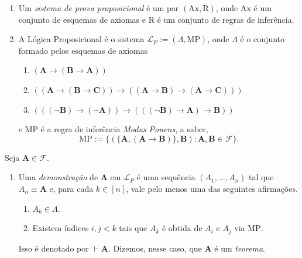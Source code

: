 \begin{definition}
    \leavevmode
        \begin{enumerate}[leftmargin=*, align=left, label=\textbf{(\alph*)}]
            \item Um \emph{sistema de prova proposicional} é um par $(\mathrm{Ax}, \mathrm{R})$, onde $\mathrm{Ax}$ é um conjunto de esquemas de axiomas e $\mathrm{R}$ é um conjunto de regras de inferência.
            \item A Lógica Proposicional é o sistema $\mathcal{L}_{P} := (\Lambda, \mathrm{MP})$, onde $\Lambda$ é o conjunto formado pelos esquemas de axiomas 
                \begin{enumerate}[label=$\mathrm{Ax}_{\arabic*}$.]
                    \item $(\mathbf{A} \rightarrow (\mathbf{B} \rightarrow \mathbf{A}))$
                    \item $((\mathbf{A} \rightarrow (\mathbf{B} \rightarrow \mathbf{C})) \rightarrow ((\mathbf{A} \rightarrow \mathbf{B})\rightarrow(\mathbf{A} \rightarrow \mathbf{C})))$
                    \item $(((\neg \mathbf{B}) \rightarrow (\neg \mathbf{A})) \rightarrow ( ((\neg \mathbf{B}) \rightarrow \mathbf{A}) \rightarrow \mathbf{B}))$
                \end{enumerate}
            e MP é a regra de inferência \emph{Modus Ponens}, a saber,
                \[
                    \mathrm{MP} := \{(\{\mathbf{A}, (\mathbf{A} \rightarrow \mathbf{B})\}, \mathbf{B} ) : \mathbf{A}, \mathbf{B} \in \mathcal{F}\}.
                \]
        \end{enumerate}
\end{definition}

\begin{definition} \label{defi.fund:demonstracao.teorema}
    Seja $\mathbf{A} \in \mathcal{F}$.
        \begin{enumerate}[leftmargin=*, align=left, label=\textbf{(\alph*)}]
            \item Uma \emph{demonstração} de $\mathbf{A}$ em $\mathcal{L}_P$ é uma sequência $(A_1, \ldots, A_n)$ tal que $A_n \equiv \mathbf{A}$ e, para cada $k \in [n]$, vale  pelo menos uma das seguintes afirmações.
                \begin{enumerate}[label=\roman*.]
                    \item $A_k \in \Lambda$.
                    \item Existem índices $i,j < k$ tais que $A_k$ é obtida de $A_i$ e $A_j$ via $\mathrm{MP}$.
                \end{enumerate}
            Isso é denotado por $\vdash \mathbf{A}$. Dizemos, nesse caso, que $\mathbf{A}$ é um \emph{teorema}.
        \end{enumerate}
\end{definition}

